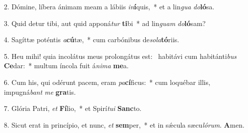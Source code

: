 2. Dómine, líbera ánimam meam a lábiis \textit{in}\textbf{í}quis,~*  et a lin\textit{gua} \textit{do}\textbf{ló}sa.\

3. Quid detur tibi, aut quid apponá\textit{tur} \textbf{ti}bi~*  ad lin\textit{guam} \textit{do}\textbf{ló}sam?\

4. Sagíttæ poténtis \textit{a}\textbf{cú}tæ,~*  cum carbónibus de\textit{so}\textit{la}\textbf{tó}riis.\

5. Heu mihi! quia incolátus meus prolongátus est: \dag\  habitávi cum habitánti\textit{bus} \textbf{Ce}dar:~*  multum íncola fuit á\textit{ni}\textit{ma} \textbf{me}a.\

6. Cum his, qui odérunt pacem, eram \textit{pa}\textbf{cí}ficus:~*  cum loquébar illis, impugná\textit{bant} \textit{me} \textbf{gra}tis.\

7. Glória Patri, \textit{et} \textbf{Fí}lio,~*  et Spirí\textit{tu}\textit{i} \textbf{Sanc}to.\

8. Sicut erat in princípio, et nunc, \textit{et} \textbf{sem}per,~*  et in sǽcula sæcu\textit{ló}\textit{rum}. \textbf{A}men.\

